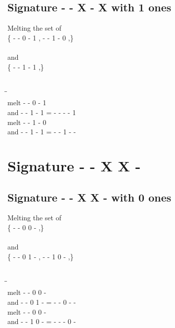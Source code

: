 \documentclass{article}
\begin{document}
\subsection{Signature - - X - X with 1 ones}
Melting the set of\\
\{ -  -  0  -  1 , -  -  1  -  0 ,\}\\\\
and\\
\{ -  -  1  -  1 ,\}\\\\
\begin{tabbing}
\hspace{3cm}\=\hspace{3cm}\=\hspace{3cm}\\[1cm]
melt\> -  -  0  -  1 \\
and\> -  -  1  -  1 \>
 =  -  -  -  -  1 \\[1mm]
melt\> -  -  1  -  0 \\
and\> -  -  1  -  1 \>
 =  -  -  1  -  - \\[1mm]
\end{tabbing}
\newpage
\section{Signature - - X X - }
\subsection{Signature - - X X - with 0 ones}
Melting the set of\\
\{ -  -  0  0  - ,\}\\\\
and\\
\{ -  -  0  1  - , -  -  1  0  - ,\}\\\\
\begin{tabbing}
\hspace{3cm}\=\hspace{3cm}\=\hspace{3cm}\\[1cm]
melt\> -  -  0  0  - \\
and\> -  -  0  1  - \>
 =  -  -  0  -  - \\[1mm]
melt\> -  -  0  0  - \\
and\> -  -  1  0  - \>
 =  -  -  -  0  - \\[1mm]
\end{tabbing}
\newpage
\end{document}
